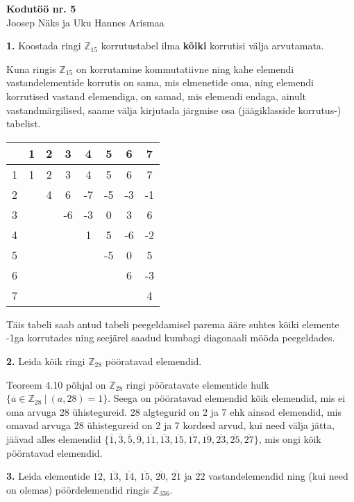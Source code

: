 \documentclass[a4paper, 10pt]{article}
\newcommand{\Z}{\mathbb{Z}}
\newcommand{\w}{\overline}
\begin{document}
\begin{center}
\Large\textbf{Kodutöö nr. 5}\\
\small{Joosep Näks ja Uku Hannes Arismaa}
\end{center}

\bigskip
\bigskip

\bigskip

\noindent \textbf{1.} Koostada ringi $\Z_{15}$ korrutustabel ilma {\bf kõiki} korrutisi välja arvutamata. 

\bigskip
Kuna ringis $\Z_{15}$ on korrutamine kommutatiivne ning kahe elemendi vastandelementide korrutis on sama, mis elmenetide oma, ning elemendi korrutised vastand elemendiga, on samad, mis elemendi endaga, ainult vastandmärgilised, saame välja kirjutada järgmise osa (jäägiklasside korrutus-) tabelist.

\begin{center}
\begin{tabular}{c| c c c c c c c }
&1&2&3&4&5&6&7\\
\hline
 1&1&2&3&4&5&6&7 \\ 
  2&&4&6&-7&-5&-3&-1\\  
  3&&&-6&-3&0&3&6\\
  4&&&&1&5&-6&-2\\
  5&&&&&-5&0&5\\
  6&&&&&&6&-3\\
  7&&&&&&&4
\end{tabular}
\end{center}
Täis tabeli saab antud tabeli peegeldamisel parema ääre suhtes kõiki elemente -1ga korrutades ning seejärel saadud kumbagi diagonaali mööda peegeldades.
\bigskip

\noindent \textbf{2.} Leida k\~oik ringi $\Z_{28}$ p\"o\"oratavad elemendid. 

\bigskip

Teoreem 4.10 põhjal on $\Z_{28}$ ringi pööratavate elementide hulk $\{\overline{a}\in\Z_{28}\ |\ (a,28)=1\}$. Seega on pööratavad elemendid kõik elemendid, mis ei oma arvuga 28 ühistegureid. 28 algtegurid on 2 ja 7 ehk ainsad elemendid, mis omavad arvuga 28 ühistegureid on 2 ja 7 kordsed arvud, kui need välja jätta, jäävad alles elemendid $\{\w1,\w3,\w5,\w9,\w{11},\w{13},\w{15},\w{17},\w{19},\w{23},\w{25},\w{27}\}$, mis ongi kõik pööratavad elemendid.

\bigskip

\noindent \textbf{3.} Leida elementide $\overline{12}$, $\overline{13}$, $\overline{14}$, $\overline{15}$, $\overline{20}$, $\overline{21}$ ja $\overline{22}$ vastandelemendid ning (kui need on olemas) pöördelemendid  ringis $\Z_{336}$. 
\end{document}
